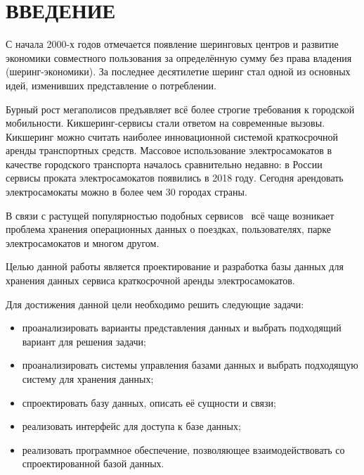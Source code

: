 \chapter*{ВВЕДЕНИЕ}

С начала 2000-х годов отмечается появление шеринговых центров и развитие экономики совместного пользования за определённую сумму без права владения  (шеринг-экономики). За последнее десятилетие шеринг стал одной из основных идей, изменивших представление о потреблении.

Бурный рост мегаполисов предъявляет всё более строгие требования к городской мобильности. Кикшеринг-сервисы стали ответом на современные вызовы. Кикшеринг можно считать наиболее инновационной системой краткосрочной аренды транспортных средств. Массовое использование электросамокатов в качестве городского транспорта началось сравнительно недавно: в России сервисы проката электросамокатов появились в 2018 году. Сегодня арендовать электросамокаты можно в более чем 30 городах страны.

В связи с растущей популярностью подобных сервисов~\cite{popularity} всё чаще возникает проблема хранения операционных данных о поездках, пользователях, парке электросамокатов и многом другом.

Целью данной работы является проектирование и разработка базы данных для хранения данных сервиса краткосрочной аренды электросамокатов.

Для достижения данной цели необходимо решить следующие задачи:

\begin{itemize}
    \item проанализировать варианты представления данных и выбрать подходящий вариант для решения задачи;
    \item проанализировать системы управления базами данных и выбрать подходящую систему для хранения данных;
    \item спроектировать базу данных, описать её сущности и связи;
    \item реализовать интерфейс для доступа к базе данных;
    \item реализовать программное обеспечение, позволяющее взаимодействовать со спроектированной базой данных.
\end{itemize}